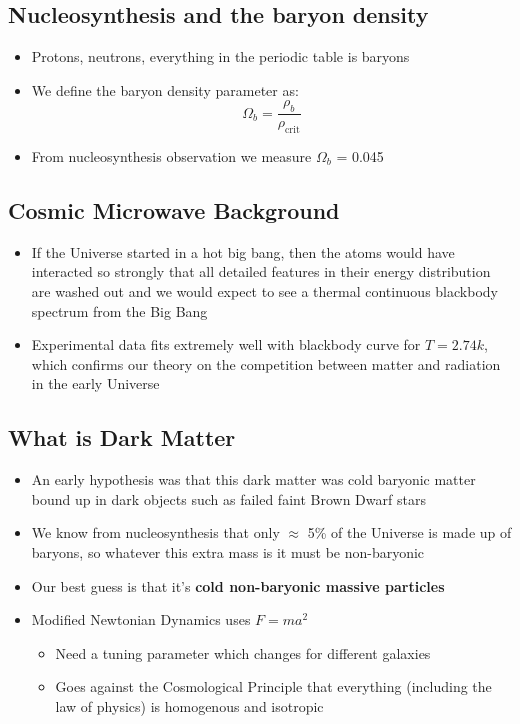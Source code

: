 \documentclass{article}
\begin{document}
\subsection{Nucleosynthesis and the baryon density}
\begin{itemize}
\item Protons, neutrons, everything in the periodic table is baryons
\item We define the baryon density parameter as:
\begin{equation}
\Omega_b=\frac{\rho_b}{\rho_\text{crit}}
\end{equation}
\item From nucleosynthesis observation we measure $\Omega_b$ = 0.045
\end{itemize}
\subsection{Cosmic Microwave Background}
\begin{itemize}
\item If the Universe started in a hot big bang, then the atoms would have interacted so strongly that all detailed features in their energy distribution are washed out and we would expect to see a thermal continuous blackbody spectrum from the Big Bang
\item Experimental data fits extremely well with blackbody curve for $T=2.74k$, which confirms our theory on the competition between matter and radiation in the early Universe
\end{itemize}
\subsection{What is Dark Matter}
\begin{itemize}
\item An early hypothesis was that this dark matter was cold baryonic matter bound up in dark objects such as failed faint Brown Dwarf stars
\item We know from nucleosynthesis that only $\approx$ 5\% of the Universe is made up of baryons, so whatever this extra mass is it must be
non-baryonic
\item Our best guess is that it's \textbf{cold non-baryonic massive particles}
\item Modified Newtonian Dynamics uses $F=ma^2$
\begin{itemize}
\item Need a tuning parameter which changes for different galaxies
\item Goes against the Cosmological Principle that everything (including the law
of physics) is homogenous and isotropic
\end{itemize}
\end{itemize}
\end{document}
